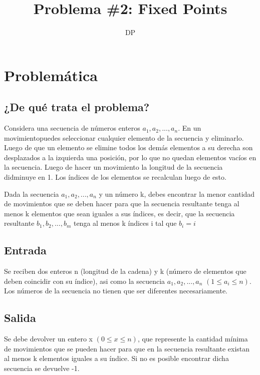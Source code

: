 \documentclass[11pt]{article}
\author{
    DP
    }
\title{Problema \#2: Fixed Points}
\begin{document}
    \maketitle
    \newpage

    \section{Problemática}
    \subsection{¿De qué trata el problema?}
    Considera una secuencia de números enteros $a_1, a_2, ... , a_n$. En un movimientopuedes seleccionar 
    cualquier elemento de la secuencia y eliminarlo. Luego de que un elemento se elimine todos los demás 
    elementos a su derecha son desplazados a la izquierda una posición, por lo que no quedan elementos vacíos 
    en la secuencia. Luego de hacer un movimiento la longitud de la secuencia didminuye en 1. Los índices 
    de los elementos se recalculan luego de esto.

    Dada la secuencia $a_1, a_2, ... , a_n$ y un número k, debes encontrar la menor cantidad de movimientos 
    que se deben hacer para que la secuencia resultante tenga al menos k elementos que sean iguales a sus 
    índices, es decir, que la secuencia resultante $b_1, b_2, ... , b_m$ tenga al menos k índices i tal que 
    $b_i = i$

    \subsection{Entrada}
    Se reciben dos enteros n (longitud de la cadena) y k (número de elementos que deben coincidir con su índice),
    asi como la secuencia $a_1, a_2, ... , a_n$ $(1 \leq a_i \leq n)$. Los números de la secuencia no tienen 
    que ser diferentes necesariamente.
    
    \subsection{Salida}
    Se debe devolver un entero x $(0 \leq x \leq n)$, que represente la cantidad mínima de movimientos que se
    pueden hacer para que en la secuencia resultante existan al menos k elementos iguales a su índice. Si no
    es posible encontrar dicha secuencia se devuelve -1.
    
\end{document}
